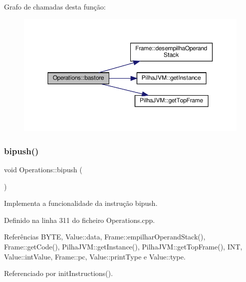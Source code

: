 Grafo de chamadas desta função\+:
\nopagebreak
\begin{figure}[H]
\begin{center}
\leavevmode
\includegraphics[width=350pt]{classOperations_a6f0ded6d2fc9921a1418387527bec8f4_cgraph}
\end{center}
\end{figure}
\mbox{\label{classOperations_a981b0f43cbe76b4fe7e2122c482d4a5b}} 
\subsubsection{\texorpdfstring{bipush()}{bipush()}}
{\footnotesize\ttfamily void Operations\+::bipush (\begin{DoxyParamCaption}{ }\end{DoxyParamCaption})\hspace{0.3cm}{\ttfamily [private]}}



Implementa a funcionalidade da instrução bipush. 



Definido na linha 311 do ficheiro Operations.\+cpp.



Referências B\+Y\+TE, Value\+::data, Frame\+::empilhar\+Operand\+Stack(), Frame\+::get\+Code(), Pilha\+J\+V\+M\+::get\+Instance(), Pilha\+J\+V\+M\+::get\+Top\+Frame(), I\+NT, Value\+::int\+Value, Frame\+::pc, Value\+::print\+Type e Value\+::type.



Referenciado por init\+Instructions().

